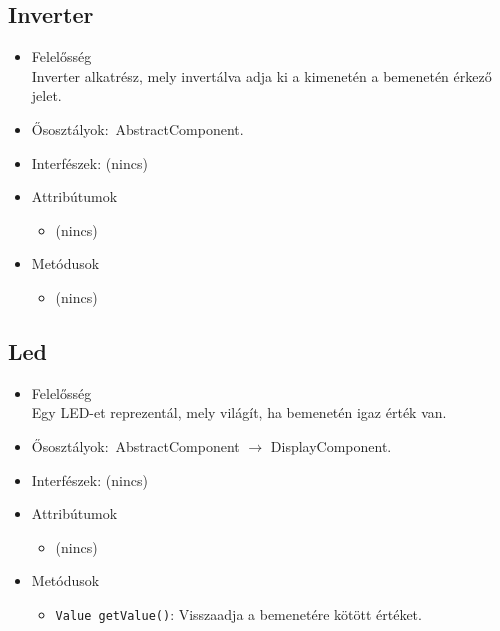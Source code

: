 \subsection{Inverter}
\begin{itemize}
\item Felelősség\\
Inverter alkatrész, mely invertálva adja ki a kimenetén a bemenetén érkező jelet.
\item Ősosztályok:\ AbstractComponent.
\item Interfészek: (nincs)
\item Attribútumok $\ $
\begin{itemize}
\item (nincs)
\end{itemize}
\item Metódusok$\ $
\begin{itemize}
\item (nincs)
\end{itemize}
\end{itemize}

\subsection{Led}
\begin{itemize}
\item Felelősség\\
Egy LED-et reprezentál, mely világít, ha bemenetén igaz érték van.
\item Ősosztályok:\ AbstractComponent $\rightarrow{}$ DisplayComponent.
\item Interfészek: (nincs)
\item Attribútumok $\ $
\begin{itemize}
\item (nincs)
\end{itemize}
\item Metódusok$\ $
\begin{itemize}
	\item \texttt{Value getValue()}: Visszaadja a bemenetére kötött értéket.
\end{itemize}
\end{itemize}

